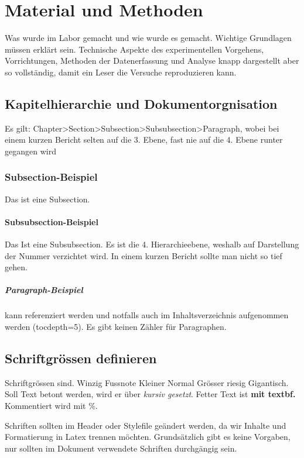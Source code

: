 \chapter{Material und Methoden}\label{chap:mm} 
Was wurde im Labor gemacht und wie wurde es gemacht. Wichtige Grundlagen müssen erklärt sein. Technische Aspekte des experimentellen Vorgehens, Vorrichtungen, Methoden der Datenerfassung und Analyse knapp dargestellt aber so vollständig, damit ein Leser die Versuche reproduzieren kann.
\section{Kapitelhierarchie und Dokumentorgnisation}\label{sec:Struktur}
Es gilt: Chapter>Section>Subsection>Subsubsection>Paragraph, wobei bei einem kurzen Bericht selten auf die 3. Ebene, fast nie auf die 4. Ebene runter gegangen wird
\subsection{Subsection-Beispiel}\label{sec:Struktur-Subsection}
Das ist eine Subsection.
\subsubsection{Subsubsection-Beispiel}\label{sec:Struktur-Subsection-Subsubsection}
Das Ist eine Subsubsection. Es ist die 4. Hierarchieebene, weshalb auf Darstellung der Nummer verzichtet wird. In einem kurzen Bericht sollte man nicht so tief gehen.
\paragraph{Paragraph-Beispiel} kann referenziert werden und notfalls auch im Inhaltsverzeichnis aufgenommen werden (tocdepth=5). Es gibt keinen Zähler für Paragraphen.
\section{Schriftgrössen definieren} \label{sec:Schriften}
Schriftgrössen sind. {\tiny Winzig} {\footnotesize Fussnote} {\small Kleiner} {\normalsize Normal} {\Large Grösser} {\huge riesig} {\Huge Gigantisch}. Soll Text betont werden, wird er über \textit{kursiv gesetzt}. Fetter Text ist \textbf{mit textbf.} Kommentiert wird mit \%. 

Schriften sollten im Header oder Stylefile geändert werden, da wir Inhalte und Formatierung in Latex trennen möchten. Grundsätzlich gibt es keine Vorgaben, nur sollten im Dokument verwendete Schriften durchgängig sein.
